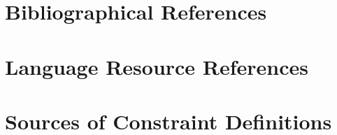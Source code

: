 \documentclass[10pt, a4paper]{article}
\begin{document}
\section{Bibliographical References}\label{sec:reference}




\section{Language Resource References}
\label{lr:ref}


\clearpage


\appendix


\section{Sources of Constraint Definitions}
\label{18_sources}
\end{document}
